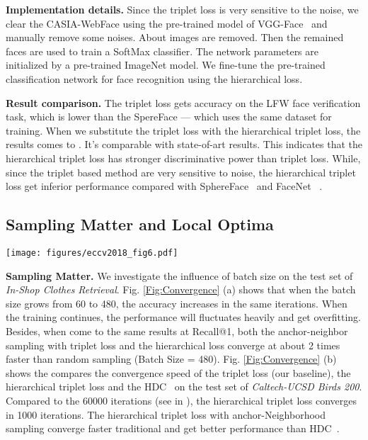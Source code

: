 \documentclass[runningheads]{llncs}
\begin{document}
\noindent\textbf{Implementation details.} Since the triplet loss is very sensitive to the noise, we clear the CASIA-WebFace using the pre-trained model of VGG-Face~\cite{parkhi2015deep} and manually remove some noises. About  images are removed. Then the remained faces are used to train a SoftMax classifier. The network parameters are initialized by a pre-trained ImageNet model. We fine-tune the pre-trained classification network for face recognition using the hierarchical loss.

\noindent\textbf{Result comparison.} The triplet loss gets  accuracy on the LFW face verification task, which is  lower than the SpereFace\cite{liu2017sphereface} ---  which uses the same dataset for training. When we substitute the triplet loss with the hierarchical triplet loss, the results comes to . It's comparable with state-of-art results. This indicates that the hierarchical triplet loss has stronger discriminative power than triplet loss. While, since the triplet based method are very sensitive to noise, the hierarchical triplet loss get inferior performance compared with SphereFace~\cite{liu2017sphereface}  and FaceNet~\cite{schroff2015facenet}  .

\subsection{Sampling Matter and Local Optima}\vspace{-2mm}

\begin{figure*}[ht]
  \centering
  \texttt{[image: figures/eccv2018\_fig6.pdf]}
  \caption{(a) Image retrieval results on In-Shop Clothes~\cite{liu2016deepfashion} with various batch sizes. (b) Image retrieval results on CUB-200-2011~\cite{wah2011caltech}.}
  \label{Fig:Convergence}
\end{figure*}

\noindent\textbf{Sampling Matter.} We investigate the influence of batch size on the test set of \emph{In-Shop Clothes Retrieval}. Fig. \ref{Fig:Convergence} (a) shows that when the batch size grows from 60 to 480, the accuracy increases in the same iterations. When the training continues, the performance will fluctuates heavily and get overfitting. Besides, when come to the same results at  Recall@1, both the anchor-neighbor sampling with triplet loss and the hierarchical loss converge at about 2 times faster than random sampling (Batch Size = 480). Fig. \ref{Fig:Convergence} (b) shows the compares the convergence speed of the triplet loss (our baseline), the hierarchical triplet loss and the HDC~\cite{Yuan_2017_ICCV} on the test set of \emph{Caltech-UCSD Birds 200}. Compared to the 60000 iterations (see in \cite{Yuan_2017_ICCV}), the hierarchical triplet loss converges in 1000 iterations. The hierarchical triplet loss with anchor-Neighborhood sampling converge faster traditional and get better performance than HDC~\cite{Yuan_2017_ICCV}.
\end{document}
